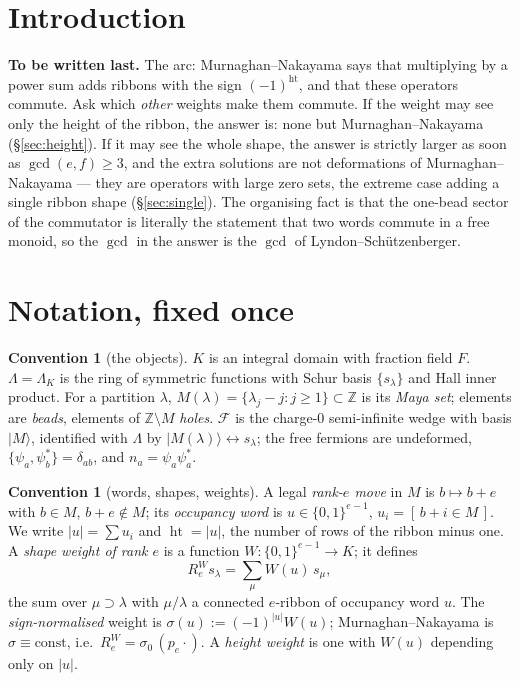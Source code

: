 \documentclass[11pt]{article}
\theoremstyle{definition}
\newtheorem{convention}[theorem]{Convention}
\theoremstyle{remark}
\newcommand{\Z}{\mathbb{Z}}
\newcommand{\Lam}{\Lambda}
\newcommand{\Fock}{\mathcal{F}}          %
\newcommand{\Fld}{F}                     %
\newcommand{\cube}{\{0,1\}}
\newcommand{\hgt}{\operatorname{ht}}     %
\begin{document}
\section{Introduction}\label{sec:intro}

\textbf{To be written last.}  The arc: Murnaghan--Nakayama says that multiplying by a power
sum adds ribbons with the sign $(-1)^{\hgt}$, and that these operators commute.  Ask which
\emph{other} weights make them commute.  If the weight may see only the height of the ribbon,
the answer is: none but Murnaghan--Nakayama (\S\ref{sec:height}).  If it may see the whole
shape, the answer is strictly larger as soon as $\gcd(e,f)\ge3$, and the extra solutions are
not deformations of Murnaghan--Nakayama --- they are operators with large zero sets, the
extreme case adding a single ribbon shape (\S\ref{sec:single}).  The organising fact is that
the one-bead sector of the commutator is literally the statement that two words commute in a
free monoid, so the $\gcd$ in the answer is the $\gcd$ of Lyndon--Sch\"utzenberger.

\section{Notation, fixed once}\label{sec:notation}

\begin{convention}[the objects]\label{conv:objects}
$K$ is an integral domain with fraction field $\Fld$.  $\Lam=\Lam_K$ is the ring of symmetric
functions with Schur basis $\{s_\lambda\}$ and Hall inner product.  For a partition $\lambda$,
$M(\lambda)=\{\lambda_j-j:j\ge1\}\subset\Z$ is its \emph{Maya set}; elements are \emph{beads},
elements of $\Z\setminus M$ \emph{holes}.  $\Fock$ is the charge-$0$ semi-infinite wedge with
basis $|M\rangle$, identified with $\Lam$ by $|M(\lambda)\rangle\leftrightarrow s_\lambda$;
the free fermions are undeformed, $\{\psi_a,\psi^*_b\}=\delta_{ab}$, and
$n_a=\psi_a\psi^*_a$.
\end{convention}

\begin{convention}[words, shapes, weights]\label{conv:weights}
A legal \emph{rank-$e$ move} in $M$ is $b\mapsto b+e$ with $b\in M$, $b+e\notin M$; its
\emph{occupancy word} is $u\in\cube^{e-1}$, $u_i=[\,b+i\in M\,]$.  We write $|u|=\sum u_i$ and
$\hgt=|u|$, the number of rows of the ribbon minus one.  A \emph{shape weight of rank $e$} is
a function $W:\cube^{e-1}\to K$; it defines
\[
   R_e^{W}s_\lambda=\sum_{\mu}W(u)\,s_\mu ,
\]
the sum over $\mu\supset\lambda$ with $\mu/\lambda$ a connected $e$-ribbon of occupancy word
$u$.  The \emph{sign-normalised} weight is $\sigma(u):=(-1)^{|u|}W(u)$; Murnaghan--Nakayama is
$\sigma\equiv\text{const}$, i.e.\ $R_e^{W}=\sigma_0\,(p_e\cdot)$.  A \emph{height weight} is
one with $W(u)$ depending only on $|u|$.
\end{convention}
\end{document}
